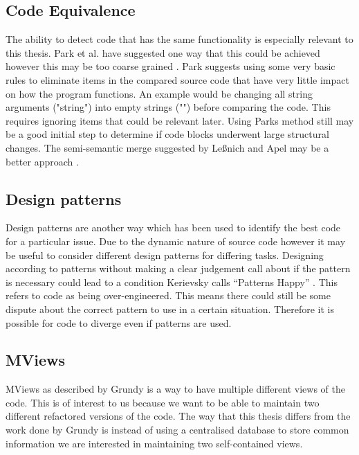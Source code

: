 \documentclass[12pt]{CRPITStyle}
\renewcommand{\cite}{\citep}
\begin{document}
\subsection{Code Equivalence}
The ability to detect code that has the same functionality is especially relevant to this thesis. Park et al. have suggested one way that this could be achieved however this may be too coarse grained \cite{Park2013}. Park suggests using some very basic rules to eliminate items in the compared source code that have very little impact on how the program functions. An example would be changing all string arguments ("string") into empty strings ("") before comparing the code. This requires ignoring items that could be relevant later. Using Parks method still may be a good initial step to determine if code blocks underwent large structural changes. The semi-semantic merge suggested by Le{\ss}nich and Apel may be a better approach \cite{LeBenich2012} \cite{Apel2011}.
\subsection{Design patterns}
Design patterns are another way which has been used to identify the best code for a particular issue. Due to the dynamic nature of source code however it may be useful to consider different design patterns for differing tasks. Designing according to patterns without making a clear judgement call about if the pattern is necessary could lead to a condition Kerievsky calls ``Patterns Happy'' \cite{Kerievsky2004}. This refers to code as being over-engineered. This means there could still be some dispute about the correct pattern to use in a certain situation. Therefore it is possible for code to diverge even if patterns are used.
\subsection{MViews}
MViews as described by Grundy is a way to have multiple different views of the code\cite{Grundy1993}. This is of interest to us because we want to be able to maintain two different refactored versions of the code. The way that this thesis differs from the work done by Grundy is instead of using a centralised database to store common information we are interested in maintaining two self-contained views.
\end{document}
